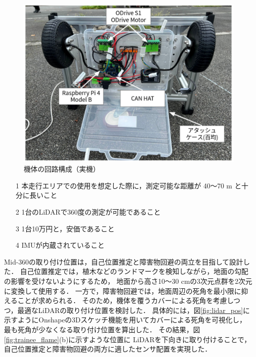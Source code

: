 \documentclass[twocolumn,9pt]{jsproceedings}
\begin{document}
\begin{figure}[h]
  \begin{center}
    \includegraphics[width=1.0\linewidth]{figs/trainee_under.pdf}
    \caption{機体の回路構成（実機）}
    \label{fig:trainee_under}
  \end{center}
\end{figure}

\begin{itemize}
  \item[1] 本走行エリアでの使用を想定した際に，測定可能な距離が 40〜70 m と十分に長いこと
  \item[2] 1台のLiDARで360度の測定が可能であること
  \item[3] 1台10万円と，安価であること
  \item[4] IMUが内蔵されていること
\end{itemize}

Mid-360の取り付け位置は，自己位置推定と障害物回避の両立を目指して設計した．
自己位置推定では，植木などのランドマークを検知しながら，地面の勾配の影響を受けないようにするため，
地面から高さ10〜30 cmの3次元点群を2次元に変換して使用する．
一方で，障害物回避では，地面周辺の死角を最小限に抑えることが求められる．
そのため，機体を覆うカバーによる死角を考慮しつつ，最適なLiDARの取り付け位置を検討した．
具体的には，図\ref{fig:lidar_pos}に示すようにOnshapeの3Dスケッチ機能を用いてカバーによる死角を可視化し，
最も死角が少なくなる取り付け位置を算出した．
その結果，図\ref{fig:trainee_flame}(b)に示すような位置に
LiDARを下向きに取り付けることで，自己位置推定と障害物回避の両方に適したセンサ配置を実現した．
\end{document}

